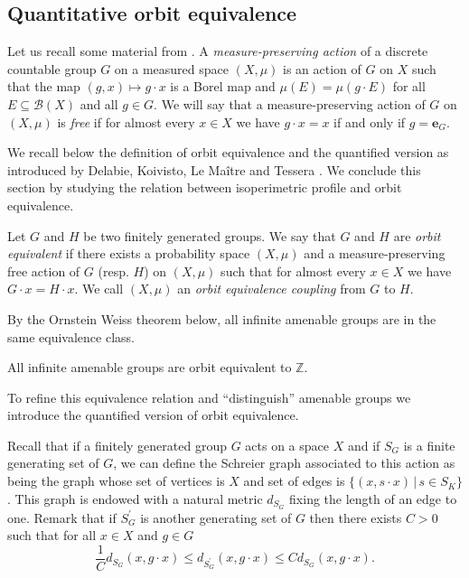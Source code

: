 \documentclass[english, 11pt, a4paper]{article}
\newcommand{\deffont}[1]{\emph{#1}}
\theoremstyle{definition}
\numberwithin{equation}{section}
\newcommand{\bZ}{\mathbb{Z}}
\newcommand{\neutre}{\boldsymbol{e}}
\begin{document}
\subsection{Quantitative orbit equivalence}\label{Subsec:ME}
Let us recall some material from \cite{DKLMT}. A \emph{measure-preserving
  action} 
of a discrete countable group $G$ on a measured space $(X,\mu)$ is an action of
$G$ on $X$ such that the map $(g,x)\mapsto g\cdot x$ is a Borel map and
$\mu(E)=\mu(g\cdot E)$ for all $E\subseteq \mathcal{B}(X)$ and all $g\in G$. We
will say that a measure-preserving action of $G$ on $(X,\mu)$ is
\emph{free} if for almost every $x\in X$ we have $g\cdot x =
x$ if and only if $g=\neutre_G$.

We recall below the definition of orbit equivalence and the
quantified version as introduced by Delabie, Koivisto, Le Maître and Tessera
\cite{DKLMT}. We conclude this section by studying the relation between isoperimetric profile
and orbit equivalence. 

\begin{Def} Let $G$ and $H$ be two finitely generated groups. We say that $G$
  and $H$ are \deffont{orbit equivalent} if there exists a probability space
  $(X,\mu)$ and a measure-preserving free action of $G$ (resp. $H$) on $(X,\mu)$
  such that for almost every $x \in X$ we have $G\cdot x = H\cdot
  x$.
  We call $(X,\mu)$ an \deffont{orbit equivalence coupling} from $G$ to $H$.
\end{Def}

By the Ornstein Weiss theorem \cite[Th. 6]{OW80} below, all infinite amenable
groups are in the same equivalence class.  
\begin{Th}[{\cite{OW80}}]\label{Th:OW}
  All infinite amenable groups are orbit equivalent to $\bZ$. 
\end{Th}

To refine this equivalence relation and “distinguish” amenable groups we
introduce the quantified version of orbit equivalence.

Recall that if a finitely generated group $G$ acts on a space $X$ and if $S_G$
is a finite generating set of $G$, we can define the Schreier graph associated to this
action as being the graph whose set of vertices is $X$ and set of edges is
$\{(x,s\cdot x) \, | \, s\in S_K\}$. This graph is endowed with a natural metric
$d_{S_G}$ fixing the length of an edge to one. Remark that if $S^\prime_G$ is another
generating set of $G$ then there exists $C>0$ such that for all $x\in X$ and
$g\in G$
\begin{equation*}
 \frac{1}{C}d_{S_G}(x,g\cdot x) \leq d_{S^{\prime}_G}(x,g\cdot x) \leq Cd_{S_G}(x,g\cdot x).
\end{equation*}
\end{document}
